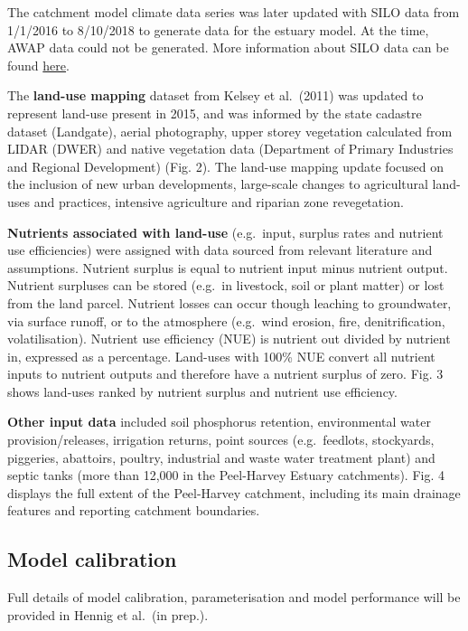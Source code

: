 \documentclass[
]{book}
\begin{document}
The catchment model climate data series was later updated with SILO data from 1/1/2016 to 8/10/2018 to generate data for the estuary model. At the time, AWAP data could not be generated. More information about SILO data can be found \href{https://www.longpaddock.qld.gov.au/silo/}{here}.

The \textbf{land-use mapping} dataset from Kelsey et al.~(2011) was updated to represent land-use present in 2015, and was informed by the state cadastre dataset (Landgate), aerial photography, upper storey vegetation calculated from LIDAR (DWER) and native vegetation data (Department of Primary Industries and Regional Development) (Fig. 2). The land-use mapping update focused on the inclusion of new urban developments, large-scale changes to agricultural land-uses and practices, intensive agriculture and riparian zone revegetation.

\textbf{Nutrients associated with land-use} (e.g.~input, surplus rates and nutrient use efficiencies) were assigned with data sourced from relevant literature and assumptions. Nutrient surplus is equal to nutrient input minus nutrient output. Nutrient surpluses can be stored (e.g.~in livestock, soil or plant matter) or lost from the land parcel. Nutrient losses can occur though leaching to groundwater, via surface runoff, or to the atmosphere (e.g.~wind erosion, fire, denitrification, volatilisation). Nutrient use efficiency (NUE) is nutrient out divided by nutrient in, expressed as a percentage. Land-uses with 100\% NUE convert all nutrient inputs to nutrient outputs and therefore have a nutrient surplus of zero. Fig. 3 shows land-uses ranked by nutrient surplus and nutrient use efficiency.~

\textbf{Other input data} included soil phosphorus retention, environmental water provision/releases, irrigation returns, point sources (e.g.~feedlots, stockyards, piggeries, abattoirs, poultry, industrial and waste water treatment plant) and septic tanks (more than 12,000 in the Peel-Harvey Estuary catchments). Fig. 4 displays the full extent of the Peel-Harvey catchment, including its main drainage features and reporting catchment boundaries.~

\hypertarget{model-calibration}{%
\subsection{Model calibration}\label{model-calibration}}

Full details of model calibration, parameterisation and model performance will be provided in Hennig et al.~(in prep.).~
\end{document}
